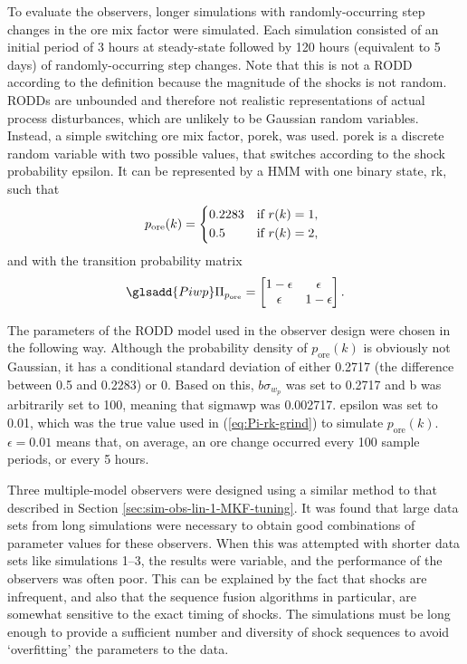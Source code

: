To evaluate the observers, longer simulations with randomly-occurring step changes in the ore mix factor were simulated. Each simulation consisted of an initial period of 3 hours at steady-state followed by 120 hours (equivalent to 5 days) of randomly-occurring step changes. Note that this is not a \gls{RODD} according to the definition because the magnitude of the shocks is not random. \gls{RODD}s are unbounded and therefore not realistic representations of actual process disturbances, which are unlikely to be Gaussian random variables. Instead, a simple switching ore mix factor, \gls{porek}, was used. \gls{porek} is a discrete random variable with two possible values, that switches according to the shock probability \gls{epsilon}. It can be represented by a \gls{HMM} with one binary state, \gls{rk}, such that
\begin{equation} \label{eq:pk-grind}
	p_\text{ore}(k) = \begin{cases*}
		0.2283 & if $r(k)=1$, \\
		0.5 & if $r(k)=2$,
	\end{cases*} \\
\end{equation}
and with the transition probability matrix
\begin{equation} \label{eq:Pi-rk-grind}
	\glsadd{Piwp}\Pi_{p_\text{ore}} = \begin{bmatrix}
		1-\epsilon & \epsilon \\
		\epsilon & 1-\epsilon
	\end{bmatrix}.
\end{equation}

The parameters of the \gls{RODD} model used in the observer design were chosen in the following way. Although the probability density of $p_\text{ore}(k)$ is obviously not Gaussian, it has a conditional standard deviation of either 0.2717 (the difference between 0.5 and 0.2283) or 0. Based on this, $b\sigma_{w_p}$ was set to 0.2717 and \gls{b} was arbitrarily set to 100, meaning that \gls{sigmawp} was 0.002717. \gls{epsilon} was set to 0.01, which was the true value used in (\ref{eq:Pi-rk-grind}) to simulate $p_\text{ore}(k)$. $\epsilon=0.01$ means that, on average, an ore change occurred every 100 sample periods, or every 5 hours.

Three multiple-model observers were designed using a similar method to that described in Section \ref{sec:sim-obs-lin-1-MKF-tuning}. It was found that large data sets from long simulations were necessary to obtain good combinations of parameter values for these observers. When this was attempted with shorter data sets like simulations 1--3, the results were variable, and the performance of the observers was often poor. This can be explained by the fact that shocks are infrequent, and also that the sequence fusion algorithms in particular, are somewhat sensitive to the exact timing of shocks. The simulations must be long enough to provide a sufficient number and diversity of shock sequences to avoid `overfitting' the parameters to the data.

